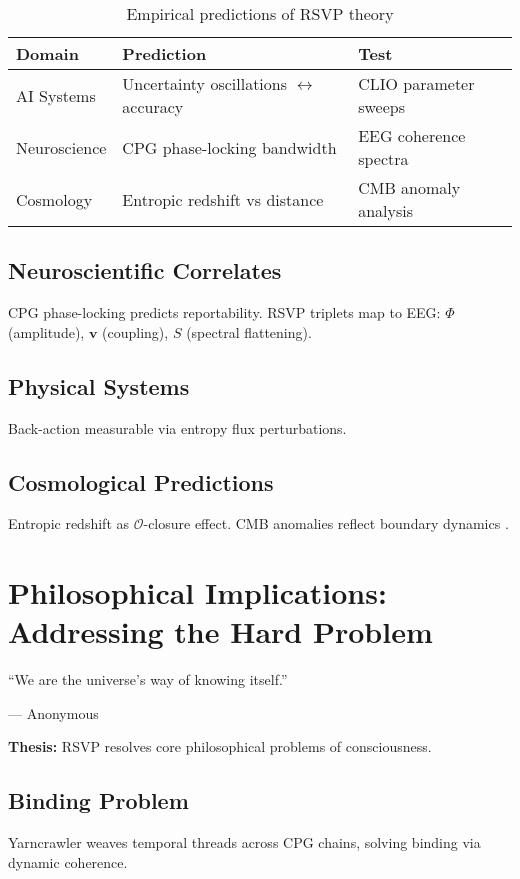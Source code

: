 \documentclass[12pt]{book}
\theoremstyle{definition}
\begin{document}
\begin{table}[h]
\centering
\begin{tabular}{lll}
\hline
\textbf{Domain} & \textbf{Prediction} & \textbf{Test} \\
\hline
AI Systems & Uncertainty oscillations $\leftrightarrow$ accuracy & CLIO parameter sweeps \\
Neuroscience & CPG phase-locking bandwidth & EEG coherence spectra \\
Cosmology & Entropic redshift vs distance & CMB anomaly analysis \\
\hline
\end{tabular}
\caption{Empirical predictions of RSVP theory}
\label{tab:empirical}
\end{table}

\section{Neuroscientific Correlates}
CPG phase-locking predicts reportability. RSVP triplets map to EEG: $\Phi$ (amplitude), $\mathbf{v}$ (coupling), $S$ (spectral flattening).

\section{Physical Systems}
Back-action measurable via entropy flux perturbations.

\section{Cosmological Predictions}
Entropic redshift as $\mathcal{O}$-closure effect. CMB anomalies reflect boundary dynamics \cite{gibbs2025entropic}.

\chapter{Philosophical Implications: Addressing the Hard Problem}
\label{chap:philosophy}
\epigraph{``We are the universe’s way of knowing itself.''}{--- Anonymous}

\textbf{Thesis:} RSVP resolves core philosophical problems of consciousness.

\section{Binding Problem}
Yarncrawler weaves temporal threads across CPG chains, solving binding via dynamic coherence.
\end{document}
